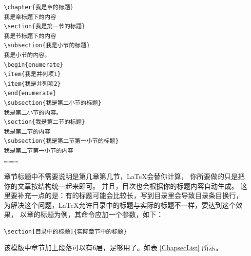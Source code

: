 {
\linespread{1}
\noindent
\begin{verbatim}
\chapter{我是章的标题}
我是章标题下的内容
\section{我是第一节的标题}
我是节标题下的内容
\subsection{我是小节的标题}
我是小节的内容。
\begin{enumerate}
\item{我是并列项1}
\item{我是并列项2}
\end{enumerate}
\subsection{我是第二小节的标题}
我是第二小节的内容。
\section{我是第二节的标题}
我是第二节的内容
\subsection{我是第二节第一小节的标题}
我是第二节第一小节的内容
…………
\end{verbatim}
}

章节标题中不需要说明是第几章第几节，\LaTeX 会替你计算，
你所要做的只是把你的文章按结构统一起来即可。
并且，目次也会根据你的标题内容自动生成。
这里要补充一点的是：有的标题可能会比较长，写到目录里会导致目录条目换行，
为解决这个问题，\LaTeX 允许目录中的标题与实际的标题不一样，要达到这个效果，
以章的标题为例，其命令应加一个参数，如下：

\verb+\section[目录中的标题]{实际章节中的标题}+

该模版中章节加上段落可以有6层，足够用了。如表 \ref{ChapsecList} 所示。

